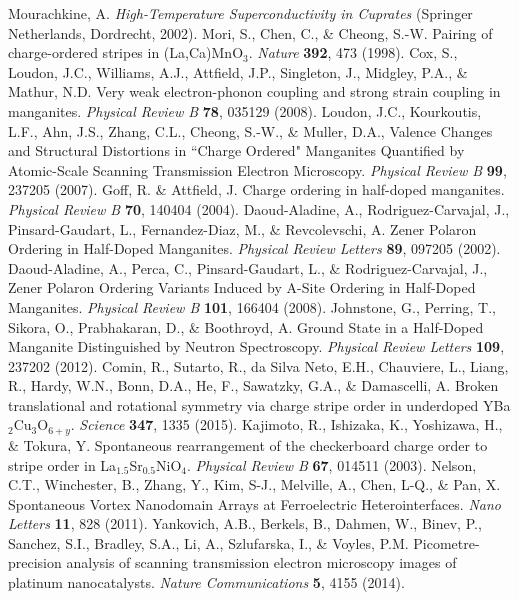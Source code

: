 \documentclass[12pt]{article}
\begin{document}
\begin{thebibliography}{99}
    Mourachkine, A. \textit{High-Temperature Superconductivity in Cuprates} (Springer Netherlands, Dordrecht, 2002).
	Mori, S., Chen, C., \& Cheong, S.-W. Pairing of charge-ordered stripes in (La,Ca)MnO$_3$. \textit{Nature} \textbf{392}, 473 (1998).
	Cox, S., Loudon, J.C., Williams, A.J., Attfield, J.P., Singleton, J., Midgley, P.A., \& Mathur, N.D. Very weak electron-phonon coupling and strong strain coupling in manganites. \textit{Physical Review B} \textbf{78}, 035129 (2008).
   	Loudon, J.C., Kourkoutis, L.F., Ahn, J.S., Zhang, C.L., Cheong, S.-W., \& Muller, D.A., Valence Changes and Structural Distortions in ``Charge Ordered" Manganites Quantified by Atomic-Scale Scanning Transmission Electron Microscopy. \textit{Physical Review B} \textbf{99}, 237205 (2007).
    Goff, R. \& Attfield, J. Charge ordering in half-doped manganites. \textit{Physical Review B} \textbf{70}, 140404 (2004).
    Daoud-Aladine, A., Rodriguez-Carvajal, J., Pinsard-Gaudart, L., Fernandez-Diaz, M., \& Revcolevschi, A. Zener Polaron Ordering in Half-Doped Manganites. \textit{Physical Review Letters} \textbf{89}, 097205 (2002).
    Daoud-Aladine, A., Perca, C., Pinsard-Gaudart, L., \& Rodriguez-Carvajal, J., Zener Polaron Ordering Variants Induced by A-Site Ordering in Half-Doped Manganites. \textit{Physical Review B} \textbf{101}, 166404 (2008).
    Johnstone, G., Perring, T., Sikora, O., Prabhakaran, D., \& Boothroyd, A. Ground State in a Half-Doped Manganite Distinguished by Neutron Spectroscopy. \textit{Physical Review Letters} \textbf{109}, 237202 (2012).
    Comin, R., Sutarto, R., da Silva Neto, E.H., Chauviere, L., Liang, R., Hardy, W.N., Bonn, D.A., He, F., Sawatzky, G.A., \& Damascelli, A. Broken translational and rotational symmetry via charge stripe order in underdoped YBa$_2$Cu$_3$O$_{6+y}$. \textit{Science} \textbf{347}, 1335 (2015).
    Kajimoto, R., Ishizaka, K., Yoshizawa, H., \& Tokura, Y. Spontaneous rearrangement of the checkerboard charge order to stripe order in La$_{1.5}$Sr$_{0.5}$NiO$_4$. \textit{Physical Review B} \textbf{67}, 014511 (2003).
    Nelson, C.T., Winchester, B., Zhang, Y., Kim, S-J., Melville, A., Chen, L-Q., \& Pan, X.  Spontaneous Vortex Nanodomain Arrays at Ferroelectric Heterointerfaces. \textit{Nano Letters} \textbf{11}, 828 (2011).
    Yankovich, A.B., Berkels, B., Dahmen, W., Binev, P., Sanchez, S.I., Bradley, S.A., Li, A., Szlufarska, I., \& Voyles, P.M. Picometre-precision analysis of scanning transmission electron microscopy images of platinum nanocatalysts. \textit{Nature Communications} \textbf{5}, 4155 (2014).

\end{thebibliography}
\end{document}
